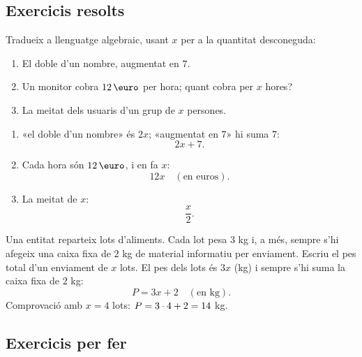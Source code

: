 \subsection{Exercicis resolts}

\begin{exresolt}
Tradueix a llenguatge algebraic, usant $x$ per a la quantitat desconeguda:
\begin{enumerate}[label=\alph*), leftmargin=1.6em]
  \item El doble d'un nombre, augmentat en $7$.
  \item Un monitor cobra $12\eur$ per hora; quant cobra per $x$ hores?
  \item La meitat dels usuaris d'un grup de $x$ persones.
\end{enumerate}
\solucio
\begin{enumerate}[label=\alph*), leftmargin=1.6em]
  \item «el doble d'un nombre» és $2x$; «augmentat en $7$» hi suma $7$:
        \[ 2x+7. \]
  \item Cada hora són $12\eur$, i en fa $x$:
        \[ 12x \quad(\text{en euros}). \]
  \item La meitat de $x$:
        \[ \dfrac{x}{2}. \]
\end{enumerate}
\end{exresolt}

\begin{exresolt}
Una entitat reparteix lots d'aliments. Cada lot pesa $3$ kg i, a més, sempre
s'hi afegeix una caixa fixa de $2$ kg de material informatiu per enviament.
Escriu el pes total d'un enviament de $x$ lots.
\solucio
El pes dels lots és $3x$ (kg) i sempre s'hi suma la caixa fixa de $2$ kg:
\[
P = 3x + 2 \quad(\text{en kg}).
\]
Comprovació amb $x=4$ lots: $P = 3\cdot 4 + 2 = 14$ kg.
\end{exresolt}

\subsection{Exercicis per fer}

